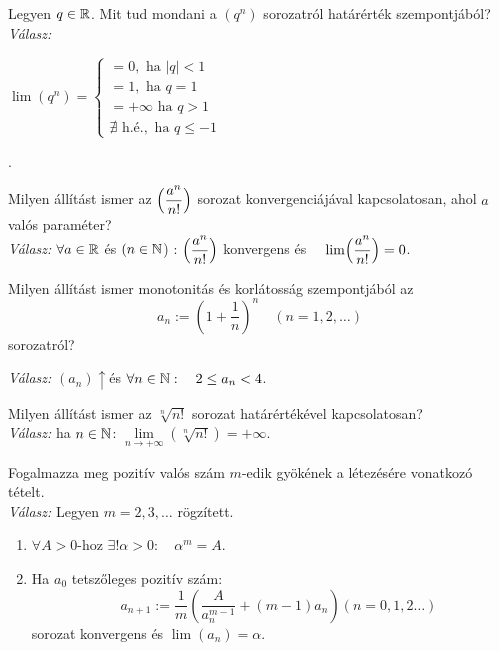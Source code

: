\documentclass[a4paper,12pt]{article}
\begin{document}
\begin{compactenum}
    \bigskip
    \item\noindent Legyen $q \in \mathbb{R}$. Mit tud mondani a $(q^n)$ sorozatról határérték szempontjából?\\
     \emph{Válasz:} 
     
     {\centering
    $\lim(q^n)=\left\{\begin{gathered}
	=0, \text{ ha } |q|<1\\
	=1, \text{ ha } q=1\\
    =+\infty \text{ ha } q>1\\
    \nexists \text{ h.é.}, \text{ ha } q\leq -1
	\end{gathered}\right.$
	\par}.
    
    \bigskip
    \item\noindent Milyen állítást ismer az $\displaystyle\Bigl(\frac{a^n}{n!}\Bigr)$ sorozat konvergenciájával kapcsolatosan, ahol $a$ valós paraméter?\\
	\emph{Válasz: } $\forall a \in \mathbb{R}$ és $(n\in \mathbb{N}$) : \quad $\displaystyle \Bigl(\frac{a^n}{n!}\Bigr)$ \quad konvergens és $\displaystyle \quad \lim\Bigl(\frac{a^n}{n!}\Bigr)=0$.
    
    \bigskip
    \item\noindent Milyen állítást ismer monotonitás és korlátosság szempontjából az
    \[a_n:=\left(1+\frac{1}{n}\right)^n \quad (n=1, 2, \ldots)\]
    sorozatról?

    \emph{Válasz: } $(a_n) \uparrow$\quad és \quad $\forall n \in \mathbb{N}: \quad 2\leq a_n < 4$.

    \bigskip
    \item\noindent Milyen állítást ismer az $\sqrt[n]{n!}$ sorozat határértékével kapcsolatosan?\\
    \emph{Válasz: } ha $n \in \mathbb{N}$:
    $\underset{n\rightarrow+\infty}{\lim}(\sqrt[n]{n!})=+\infty$.
	
    \bigskip
    \item\noindent Fogalmazza meg pozitív valós szám $m$-edik gyökének a létezésére vonatkozó
    tételt.\\
    \emph{Válasz: } Legyen $m=2,3,\ldots$ rögzített.
    \begin{enumerate}
    	\item $ \forall A>0$-hoz $\exists! \alpha>0: \quad \alpha^m=A.$
    	\item Ha $a_0$ tetszőleges pozitív szám: \[ \quad a_{n+1}:=\frac{1}{m}\left(\frac{A}{a_n^{m-1}}+(m-1)a_n\right) (n=0,1,2\ldots) \] sorozat konvergens és $\lim(a_n)=\alpha$.
    \end{enumerate}
	\end{compactenum}
    
\end{document}
